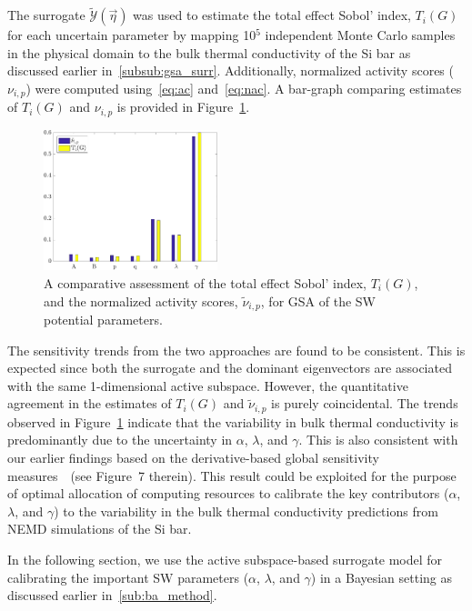 The surrogate $\tilde{\mathcal{Y}}(\vec{\eta})$ was used to estimate the total effect Sobol'
 index, $T_i(G)$ for each
uncertain parameter by mapping 10$^5$ independent Monte Carlo samples in the physical domain
to the bulk thermal conductivity of the Si bar as discussed earlier in~\ref{subsub:gsa_surr}. 
Additionally, normalized activity scores ($\nu_{i,p}$) were computed using~\eqref{eq:ac} and~\eqref{eq:nac}.
A bar-graph comparing estimates of $T_i(G)$ and $\nu_{i,p}$ is provided in
Figure~\ref{fig:gsa}. 
%
\begin{figure}[htbp]
\begin{center}
\includegraphics[width=0.45\textwidth]{./Figures/free_as_gsa}
\caption{A comparative assessment of the total effect Sobol' index, $T_i(G)$, and the normalized
activity scores, $\tilde{\nu}_{i,p}$, for GSA of the SW potential parameters.}
\label{fig:gsa}
\end{center}
\end{figure}
%
The sensitivity trends from the two approaches are found to be consistent. This is expected since
both the surrogate and the dominant eigenvectors are associated with the same 1-dimensional active 
subspace. However, the quantitative agreement in the estimates of $T_i(G)$ and $\tilde{\nu}_{i,p}$
is purely coincidental. The trends observed in Figure~\ref{fig:gsa} indicate
 that the variability in bulk thermal conductivity is predominantly
due to the uncertainty in $\alpha$, $\lambda$, and $\gamma$. This is also consistent with our earlier
findings based on the derivative-based global sensitivity measures~\cite{Vohra:2018a}~(see Figure~7 therein). 
This result could be exploited for the purpose of optimal allocation of computing resources to calibrate
the key contributors ($\alpha$, $\lambda$, and $\gamma$) to the variability in the bulk thermal conductivity
predictions from NEMD simulations of the Si bar. 

In the following section, we use the active subspace-based surrogate model
for calibrating the important SW parameters ($\alpha$, $\lambda$, and $\gamma$)
in a Bayesian setting as discussed earlier in~\ref{sub:ba_method}.

